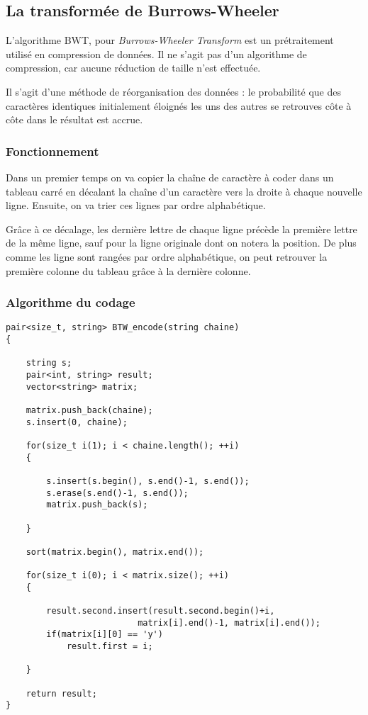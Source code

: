 \subsection{La transformée de Burrows-Wheeler}

\par L'algorithme BWT, pour \textit{Burrows-Wheeler Transform} est un prétraitement utilisé en compression de données. Il ne s'agit pas d'un algorithme de compression, car aucune réduction de taille n'est effectuée. 
\par Il s'agit d'une méthode de réorganisation des données : le probabilité que des caractères identiques initialement éloignés les uns des autres se retrouves côte à côte dans le résultat est accrue.


\subsubsection{Fonctionnement}
\par Dans un premier temps on va copier la chaîne de caractère à coder dans un tableau carré en décalant la chaîne d'un caractère vers la droite à chaque nouvelle ligne. Ensuite, on va trier ces lignes par ordre alphabétique.
\par Grâce à ce décalage, les dernière lettre de chaque ligne précède la première lettre de la même ligne, sauf pour la ligne originale dont on notera la position. De plus comme les ligne sont rangées par ordre alphabétique, on peut retrouver la première colonne du tableau grâce à la dernière colonne.\\

\subsubsection{Algorithme du codage}
\begin{verbatim}
pair<size_t, string> BTW_encode(string chaine)
{
	
	string s;
	pair<int, string> result;
	vector<string> matrix;
	
	matrix.push_back(chaine);
	s.insert(0, chaine);
	
	for(size_t i(1); i < chaine.length(); ++i)
	{
		
		s.insert(s.begin(), s.end()-1, s.end());
		s.erase(s.end()-1, s.end());
		matrix.push_back(s);
		
	}
	
	sort(matrix.begin(), matrix.end());
	
	for(size_t i(0); i < matrix.size(); ++i)
	{
		
		result.second.insert(result.second.begin()+i, 
		                  matrix[i].end()-1, matrix[i].end());
		if(matrix[i][0] == 'y')
			result.first = i;

	}
	
	return result;	
}
\end{verbatim}


